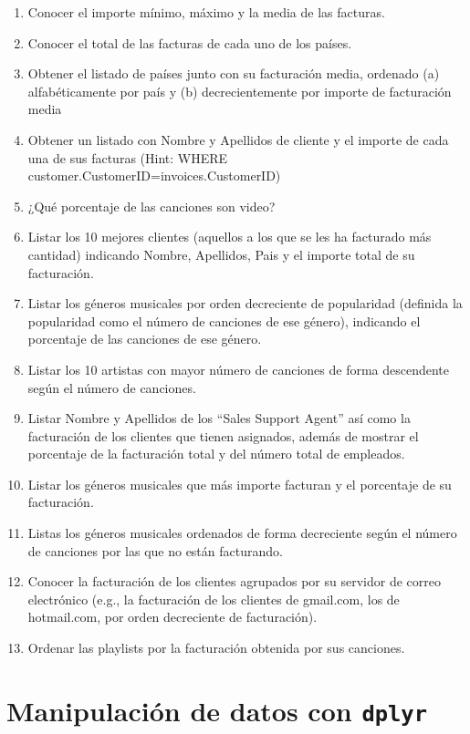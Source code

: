 \documentclass[]{book}
\begin{document}
\begin{enumerate}
\def\labelenumi{\arabic{enumi}.}
\item
  Conocer el importe mínimo, máximo y la media de las facturas.
\item
  Conocer el total de las facturas de cada uno de los países.
\item
  Obtener el listado de países junto con su facturación media, ordenado
  (a) alfabéticamente por país y (b) decrecientemente por importe de
  facturación media
\item
  Obtener un listado con Nombre y Apellidos de cliente y el importe de
  cada una de sus facturas (Hint: WHERE
  customer.CustomerID=invoices.CustomerID)
\item
  ¿Qué porcentaje de las canciones son video?
\item
  Listar los 10 mejores clientes (aquellos a los que se les ha facturado
  más cantidad) indicando Nombre, Apellidos, Pais y el importe total de
  su facturación.
\item
  Listar los géneros musicales por orden decreciente de popularidad
  (definida la popularidad como el número de canciones de ese género),
  indicando el porcentaje de las canciones de ese género.
\item
  Listar los 10 artistas con mayor número de canciones de forma
  descendente según el número de canciones.
\item
  Listar Nombre y Apellidos de los ``Sales Support Agent'' así como la
  facturación de los clientes que tienen asignados, además de mostrar el
  porcentaje de la facturación total y del número total de empleados.
\item
  Listar los géneros musicales que más importe facturan y el porcentaje
  de su facturación.
\item
  Listas los géneros musicales ordenados de forma decreciente según el
  número de canciones por las que no están facturando.
\item
  Conocer la facturación de los clientes agrupados por su servidor de
  correo electrónico (e.g., la facturación de los clientes de gmail.com,
  los de hotmail.com, por orden decreciente de facturación).
\item
  Ordenar las playlists por la facturación obtenida por sus canciones.
\end{enumerate}

\chapter{\texorpdfstring{Manipulación de datos con
\texttt{dplyr}}{Manipulación de datos con dplyr}}\label{manipulacion-de-datos-con-dplyr}
\end{document}
